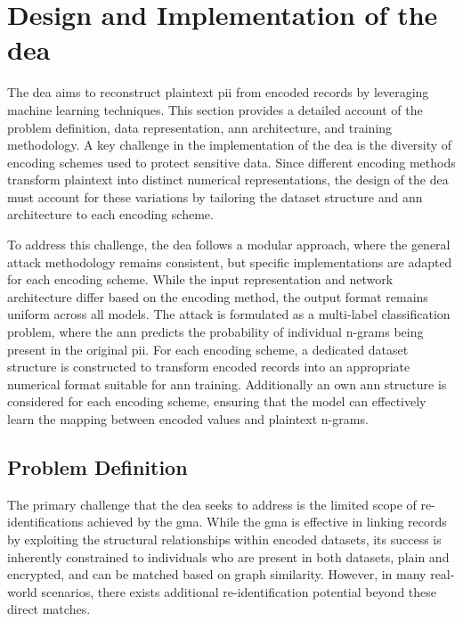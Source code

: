 \section{Design and Implementation of the \ac{dea}} \label{sec:designandimplementation}

The \ac{dea} aims to reconstruct plaintext \ac{pii} from encoded records by leveraging machine learning techniques.
This section provides a detailed account of the problem definition, data representation, \ac{ann} architecture, and training methodology.
A key challenge in the implementation of the \ac{dea} is the diversity of encoding schemes used to protect sensitive data.
Since different encoding methods transform plaintext into distinct numerical representations, the design of the \ac{dea} must account for these variations by tailoring the dataset structure and \ac{ann} architecture to each encoding scheme.

To address this challenge, the \ac{dea} follows a modular approach, where the general attack methodology remains consistent, but specific implementations are adapted for each encoding scheme.
While the input representation and network architecture differ based on the encoding method, the output format remains uniform across all models.
The attack is formulated as a multi-label classification problem, where the \ac{ann} predicts the probability of individual n-grams being present in the original \ac{pii}.
For each encoding scheme, a dedicated dataset structure is constructed to transform encoded records into an appropriate numerical format suitable for \ac{ann} training.
Additionally an own \ac{ann} structure is considered for each encoding scheme, ensuring that the model can effectively learn the mapping between encoded values and plaintext n-grams.

\subsection{Problem Definition} \label{sec:problemdefinition}

The primary challenge that the \ac{dea} seeks to address is the limited scope of re-identifications achieved by the \ac{gma}.
While the \ac{gma} is effective in linking records by exploiting the structural relationships within encoded datasets, its success is inherently constrained to individuals who are present in both datasets, plain and encrypted, and can be matched based on graph similarity.
However, in many real-world scenarios, there exists additional re-identification potential beyond these direct matches.

